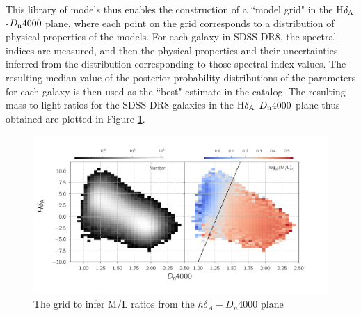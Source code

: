 This library of models thus enables the construction of a 
``model grid" in the H$\delta_{\rm A}$-$D_{\rm n}4000$ plane,
where each point on the grid corresponds to a distribution of
physical properties of the models.
For each galaxy in SDSS DR8, the spectral indices are measured, 
and then the physical properties and their uncertainties inferred
from the distribution corresponding to those spectral index values.
The resulting median value of the posterior probability distributions 
of the parameters for each galaxy is then used 
as the ``best" estimate in the catalog. The resulting 
mass-to-light ratios for the SDSS DR8 galaxies in the 
H$\delta_{\rm A}$-$D_{\rm n}4000$ plane thus obtained are 
plotted in Figure \ref{fig:kauff_grid}.\\ 

\begin{figure}
\includegraphics[width=\textwidth]{figures/hd_d4000_mlratio_coarser_binning.pdf}
\caption[The \citet{kauffmann_stellar_2003} grid to infer M/L ratios from the $h\delta_{A}-D_{n}4000$ plane]
{The \citet{kauffmann_stellar_2003} grid to infer M/L ratios from the $h\delta_{A}-D_{n}4000$ plane
\label{fig:kauff_grid}}
\end{figure}

